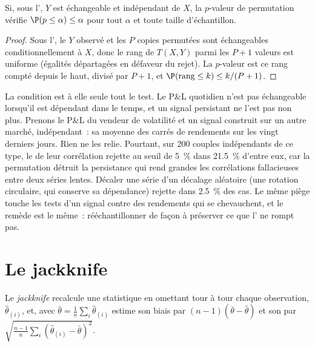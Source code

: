 \begin{proposition}\label{prop:qm:resampling:exact}
Si, sous l', $Y$ est échangeable et indépendant de $X$, la $p$-valeur de permutation vérifie $\P(p \le \alpha) \le \alpha$ pour
tout $\alpha$ et toute taille d'échantillon.
\end{proposition}

\begin{proof}
Sous l', le $Y$ observé et les $P$ copies permutées sont échangeables conditionnellement à $X$, donc le rang de $T(X, Y)$ parmi les $P + 1$
valeurs est uniforme (égalités départagées en défaveur du rejet). La $p$-valeur est ce rang compté depuis le haut, divisé par $P + 1$, et $\P(\text{rang} \le
k) \le k/(P + 1)$.
\end{proof}

La condition est à elle seule tout le test. Le P\&L quotidien n'est pas échangeable lorsqu'il est dépendant dans le temps, et un signal persistant ne l'est pas non plus.
Prenons le P\&L du vendeur de volatilité et un signal construit sur un autre marché, indépendant~: sa moyenne des carrés de rendements sur les vingt derniers jours.
Rien ne les relie. Pourtant, sur 200 couples indépendants de ce type, le  de leur corrélation rejette au seuil de 5~\% dans 21.5~\% d'entre eux,
car la permutation détruit la persistance qui rend grandes les corrélations fallacieuses entre deux séries lentes. Décaler une série
d'un décalage aléatoire (une rotation circulaire, qui conserve sa dépendance) rejette dans 2.5~\% des cas. Le même piège touche les tests d'un signal contre
des rendements qui se chevauchent, et le remède est le même~: rééchantillonner de façon à préserver ce que l' ne rompt pas.

\section{Le jackknife}

\begin{definition}[Jackknife]\label{def:qm:resampling:jackknife}
Le \emph{jackknife} recalcule une statistique en omettant tour à tour chaque observation, $\hat\theta_{(i)}$, et, avec $\bar\theta
= \frac1n\sum_i\hat\theta_{(i)}$ estime son biais par $(n - 1)(\bar\theta - \hat\theta)$ et son  par
$\sqrt{\frac{n-1}n\sum_i(\hat\theta_{(i)} - \bar\theta)^2}$.
\end{definition}

